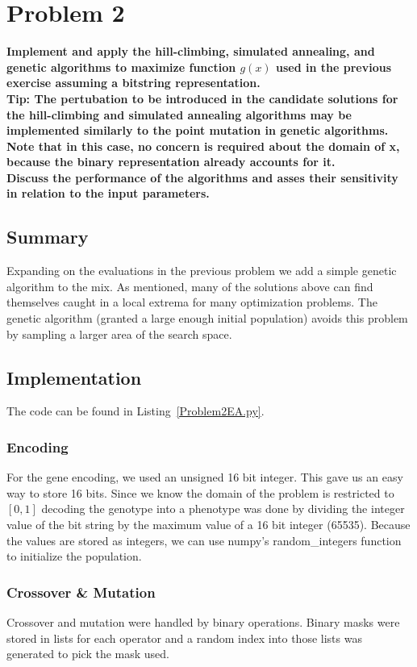 \section{Problem 2}
\textbf{Implement and apply the hill-climbing, simulated annealing, and genetic algorithms to maximize function $g(x)$ used in the previous exercise assuming a bitstring representation.} \newline \\
\textbf{Tip: The pertubation to be introduced in the candidate solutions for the hill-climbing and simulated annealing algorithms may be implemented similarly to the point mutation in genetic algorithms. Note that in this case, no concern is required about the domain of x, because the binary representation already accounts for it.} \newline \\
\textbf{Discuss the performance of the algorithms and asses their sensitivity in relation to the input parameters.}

\subsection{Summary}
Expanding on the evaluations in the previous problem we add a simple genetic algorithm to the mix. As mentioned, many of the solutions above can find themselves caught in a local extrema for many optimization problems. The genetic algorithm (granted a large enough initial population) avoids this problem by sampling a larger area of the search space.

\subsection{Implementation}
The code can be found in Listing~\ref{Problem2EA.py}.

\subsubsection{Encoding}
For the gene encoding, we used an unsigned 16 bit integer. This gave us an easy way to store 16 bits. Since we know the domain of the problem is restricted to $[0, 1]$ decoding the genotype into a phenotype was done by dividing the integer value of the bit string by the maximum value of a 16 bit integer (65535). Because the values are stored as integers, we can use numpy's random\_integers function to initialize the population.

\subsubsection{Crossover \& Mutation}
Crossover and mutation were handled by binary operations. Binary masks were stored in lists for each operator and a random index into those lists was generated to pick the mask used.

